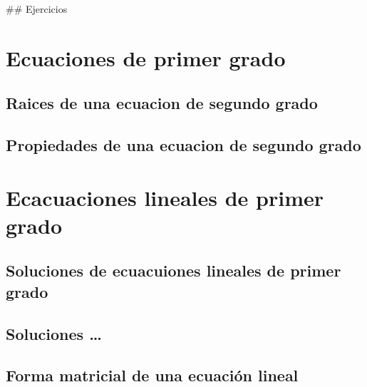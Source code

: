 \documentclass[10pt,]{krantz}
\theoremstyle{definition}
\theoremstyle{definition}
\theoremstyle{definition}
\theoremstyle{remark}
\begin{document}
\citep{vincze2014college}
\#\# Ejercicios

\hypertarget{appendix-apendice}{%
\appendix {}}


\hypertarget{ecuaciones-de-primer-grado}{%
\chapter{Ecuaciones de primer grado}\label{ecuaciones-de-primer-grado}}

\citep{xie2015}

\hypertarget{raices-de-una-ecuacion-de-segundo-grado}{%
\section{Raices de una ecuacion de segundo grado}\label{raices-de-una-ecuacion-de-segundo-grado}}

\hypertarget{propiedades-de-una-ecuacion-de-segundo-grado}{%
\section{Propiedades de una ecuacion de segundo grado}\label{propiedades-de-una-ecuacion-de-segundo-grado}}

\hypertarget{ecacuaciones-lineales-de-primer-grado}{%
\chapter{Ecacuaciones lineales de primer grado}\label{ecacuaciones-lineales-de-primer-grado}}

\hypertarget{soluciones-de-ecuacuiones-lineales-de-primer-grado}{%
\section{Soluciones de ecuacuiones lineales de primer grado}\label{soluciones-de-ecuacuiones-lineales-de-primer-grado}}

\hypertarget{soluciones}{%
\section{Soluciones \ldots{}}\label{soluciones}}

\hypertarget{forma-matricial-de-una-ecuaciuxf3n-lineal}{%
\section{Forma matricial de una ecuación lineal}\label{forma-matricial-de-una-ecuaciuxf3n-lineal}}



\printindex
\end{document}
